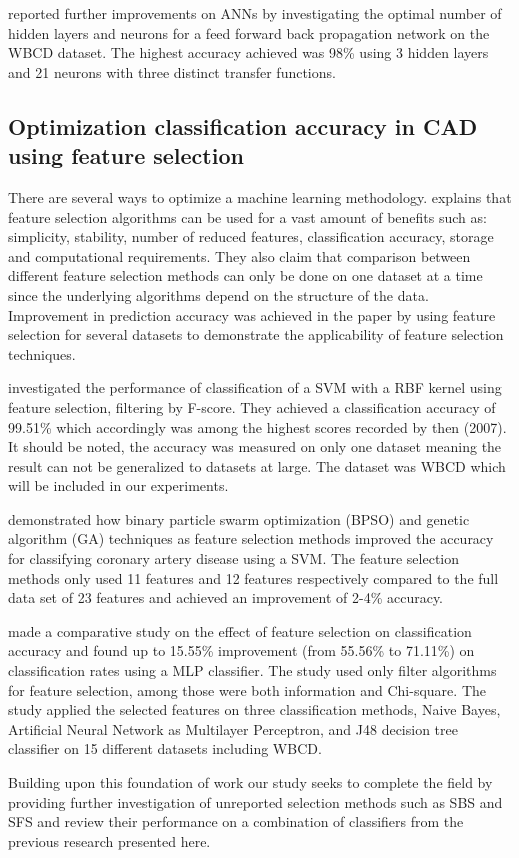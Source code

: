 \textcite{Abdel-Ilah2017} reported further improvements on ANNs by investigating the optimal number of hidden layers and neurons for a feed forward back propagation network on the WBCD dataset. The highest accuracy achieved was 98\% using 3 hidden layers and 21 neurons with three distinct transfer functions.

\subsection{Optimization classification accuracy in CAD using feature selection}


There are several ways to optimize a machine learning methodology. \textcite{c201416} explains that feature selection algorithms can be used for a vast amount of benefits such as: simplicity, stability, number of reduced features, classification accuracy, storage and computational requirements. They also claim that comparison between different feature selection methods can only be done on one dataset at a time since the underlying algorithms depend on the structure of the data. Improvement in prediction accuracy was achieved in the paper by using feature selection for several datasets to demonstrate the applicability of feature selection techniques.

\textcite{akay2009} investigated the performance of classification of a SVM with a RBF kernel using feature selection, filtering by F-score. They achieved a classification accuracy of 99.51\% which accordingly was among the highest scores recorded by then (2007). It should be noted, the accuracy was measured on only one dataset meaning the result can not be generalized to datasets at large. The dataset was WBCD which will be included in our experiments.

\textcite{b20103177} demonstrated how  binary particle swarm optimization (BPSO) and genetic algorithm (GA) techniques as feature selection methods improved the accuracy for classifying coronary artery disease using a SVM. The feature selection methods only used 11 features and 12 features respectively compared to the full data set of 23 features and achieved an improvement of 2-4\% accuracy.

\textcite{karabulut2012} made a comparative study on the effect of feature selection on classification accuracy and found up to 15.55\% improvement (from 55.56\% to 71.11\%) on classification rates using a MLP classifier. The study used only filter algorithms for feature selection, among those were both information and Chi-square. The study applied the selected features on three classification methods, Naive Bayes, Artificial Neural Network as Multilayer Perceptron, and J48 decision tree classifier on 15 different datasets including WBCD.

Building upon this foundation of work our study seeks to complete the field by providing further investigation of unreported selection methods such as SBS and SFS and review their performance on a combination of classifiers from the previous research presented here.
